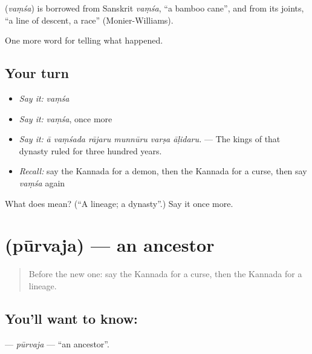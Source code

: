 \begin{cousinweb}
\textbf{} (\emph{vaṃśa}) is borrowed from Sanskrit \emph{vaṃśa}, \textquotedblleft{}a bamboo cane\textquotedblright{}, and from its joints, \textquotedblleft{}a line of descent, a race\textquotedblright{} (Monier-Williams).
\end{cousinweb}

\begin{grammarlens}[title={What you've built}]
One more word for telling what happened.
\end{grammarlens}

\subsection*{Your turn}
\begin{itemize}
\raggedright
  \item \emph{Say it:} \emph{vaṃśa}
  \item \emph{Say it:} \emph{vaṃśa}, once more
  \item \emph{Say it:} \emph{ā vaṃśada rājaru munnūru varṣa āḷidaru.} — The kings of that dynasty ruled for three hundred years.
  \item \emph{Recall:} say the Kannada for a demon, then the Kannada for a curse, then say \emph{vaṃśa} again
\end{itemize}

\begin{tcolorbox}[breakable,colback=teal!4,colframe=teal!35!black,title={Before you move on}]
What does  mean? (\textquotedblleft{}A lineage; a dynasty\textquotedblright{}.) Say it once more.
\end{tcolorbox}
\section[\texorpdfstring{\kn{ಪೂರ್ವಜ} (pūrvaja)}{ಪೂರ್ವಜ (pūrvaja)}]{ (pūrvaja) — an ancestor}

\label{lesson:KA-C341-purvaja}



\begin{quote}
Before the new one: say the Kannada for a curse, then the Kannada for a lineage.
\end{quote}

\subsection*{You'll want to know: }
\textbf{} — \emph{pūrvaja} — \textquotedblleft{}an ancestor\textquotedblright{}.


